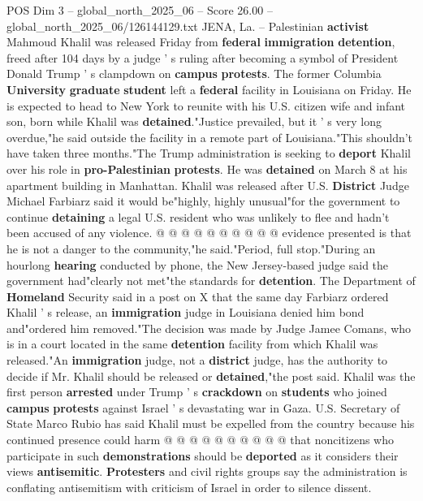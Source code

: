 \begin{textsample}{POS Dim 3 – global\_north\_2025\_06 – Score 26.00 – global\_north\_2025\_06/126144129.txt}  \label{ex:f3_pos_101}
JENA, La. -- Palestinian \textbf{activist} Mahmoud Khalil was released Friday from \textbf{federal} \textbf{immigration} \textbf{detention}, freed after 104 days by a judge ' s ruling after becoming a symbol of President Donald Trump ' s clampdown on \textbf{campus} \textbf{protests}.
The former Columbia \textbf{University} \textbf{graduate} \textbf{student} left a \textbf{federal} facility in Louisiana on Friday.
He is expected to head to New York to reunite with his U.S. citizen wife and infant son, born while Khalil was \textbf{detained}."Justice prevailed, but it ' s very long overdue,"he said outside the facility in a remote part of Louisiana."This shouldn't have taken three months."The Trump administration is seeking to \textbf{deport} Khalil over his role in \textbf{pro-Palestinian} \textbf{protests}.
He was \textbf{detained} on March 8 at his apartment building in Manhattan.
Khalil was released after U.S. \textbf{District} Judge Michael Farbiarz said it would be"highly, highly unusual"for the government to continue \textbf{detaining} a legal U.S. resident who was unlikely to flee and hadn't been accused of any violence. @ @ @ @ @ @ @ @ @ @ evidence presented is that he is not a danger to the community,"he said."Period, full stop."During an hourlong \textbf{hearing} conducted by phone, the New Jersey-based judge said the government had"clearly not met"the standards for \textbf{detention}.
The Department of \textbf{Homeland} Security said in a post on X that the same day Farbiarz ordered Khalil ' s release, an \textbf{immigration} judge in Louisiana denied him bond and"ordered him removed."The decision was made by Judge Jamee Comans, who is in a court located in the same \textbf{detention} facility from which Khalil was released."An \textbf{immigration} judge, not a \textbf{district} judge, has the authority to decide if Mr.
Khalil should be released or \textbf{detained},"the post said.
Khalil was the first person \textbf{arrested} under Trump ' s \textbf{crackdown} on \textbf{students} who joined \textbf{campus} \textbf{protests} against Israel ' s devastating war in Gaza.
U.S.
Secretary of State Marco Rubio has said Khalil must be expelled from the country because his continued presence could harm @ @ @ @ @ @ @ @ @ @ that noncitizens who participate in such \textbf{demonstrations} should be \textbf{deported} as it considers their views \textbf{antisemitic}. \textbf{Protesters} and civil rights groups say the administration is conflating antisemitism with criticism of Israel in order to silence dissent.

\end{textsample}

